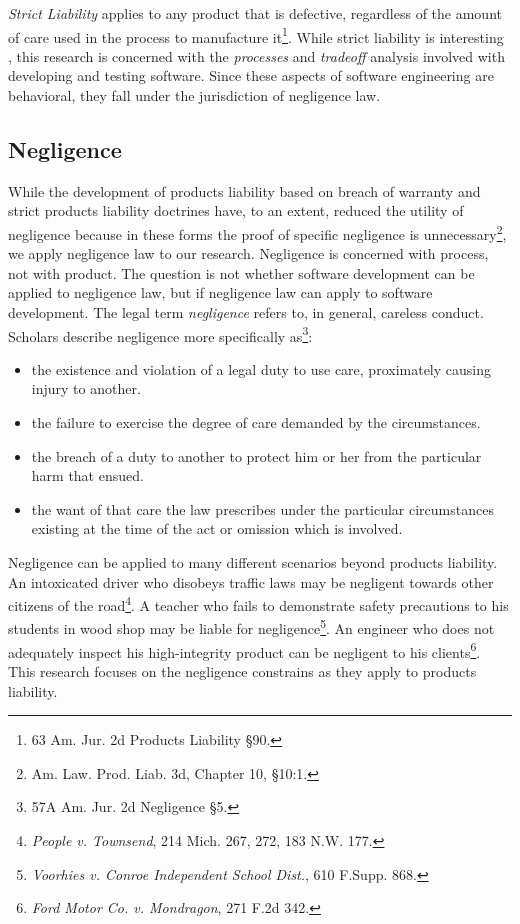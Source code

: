 \textit{Strict Liability} applies to any product that is defective, regardless
of the amount of care used in the process to manufacture it\footnote{63 Am. Jur.
2d Products Liability \S 90.}. While strict liability is interesting
\cite{Turner00}, this research is concerned with the \textit{processes} and
\textit{tradeoff} analysis involved with developing and testing software. Since
these aspects of software engineering are behavioral, they fall under the
jurisdiction of negligence law.

\subsection{Negligence}\label{SS:Negligence}
While the development of products liability based on breach of warranty and
strict products liability doctrines have, to an extent, reduced the utility of
negligence because in these forms the proof of specific negligence is
unnecessary\footnote{Am. Law. Prod. Liab. 3d, Chapter 10, \S 10:1.}, we apply
negligence law to our research. Negligence is concerned with process, not with
product. The question is not whether software development can be applied to
negligence law, but if negligence law can apply to software development. The
legal term \textit{negligence} refers to, in general, careless conduct. 
Scholars describe negligence more specifically as\footnote{57A Am. Jur. 2d
Negligence \S 5.}:

\singlespace
\begin{itemize}
 \item the existence and violation of a legal duty to use care, proximately 
 causing injury to another.
 \item the failure to exercise the degree of care demanded by the circumstances.
 \item the breach of a duty to another to protect him or her from the particular
 harm that ensued.
 \item the want of that care the law prescribes under the particular
 circumstances existing at the time of the act or omission which is involved.
\end{itemize}
\doublespace

Negligence can be applied to many different scenarios beyond products
liability. An intoxicated driver who disobeys traffic laws may be negligent
towards other citizens of the road\footnote{\textit{People v. Townsend}, 214
Mich. 267, 272, 183 N.W. 177.}. A teacher who fails to demonstrate safety
precautions to his students in wood shop may be liable for
negligence\footnote{\textit{Voorhies v. Conroe Independent School Dist.}, 610
F.Supp. 868.}. An engineer who does not adequately inspect his high-integrity
product can be negligent to his clients\footnote{\textit{Ford Motor Co. v.
Mondragon}, 271 F.2d 342.}. This research focuses on the negligence constrains
as they apply to products liability.

